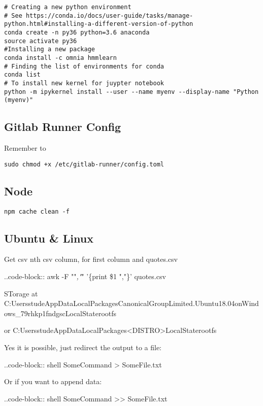 \begin{verbatim}
# Creating a new python environment 
# See https://conda.io/docs/user-guide/tasks/manage-python.html#installing-a-different-version-of-python
conda create -n py36 python=3.6 anaconda
source activate py36
#Installing a new package 
conda install -c omnia hmmlearn
# Finding the list of environments for conda 
conda list 
# To install new kernel for juypter notebook 
python -m ipykernel install --user --name myenv --display-name "Python (myenv)"
\end{verbatim}

\subsection{Gitlab Runner Config}\label{gitlab-runner-config}

Remember to

\begin{verbatim}
sudo chmod +x /etc/gitlab-runner/config.toml
\end{verbatim}


\subsection{Node}\label{node}

\begin{verbatim}
npm cache clean -f
\end{verbatim}


\subsection{Ubuntu \& Linux}\label{ubuntu-linux}

Get csv nth csv column, for first column and quotes.csv

..code-block:: awk -F ""\emph{,"}" '\{print \$1 ","\}' quotes.csv

STorage at
C:UsersstudeAppDataLocalPackagesCanonicalGroupLimited.Ubuntu18.04onWindows\_79rhkp1fndgscLocalStaterootfs

or
C:UsersstudeAppDataLocalPackages\textless DISTRO\textgreater LocalStaterootfs

Yes it is possible, just redirect the output to a file:

..code-block:: shell SomeCommand \textgreater{} SomeFile.txt

Or if you want to append data:

..code-block:: shell SomeCommand \textgreater\textgreater{} SomeFile.txt

